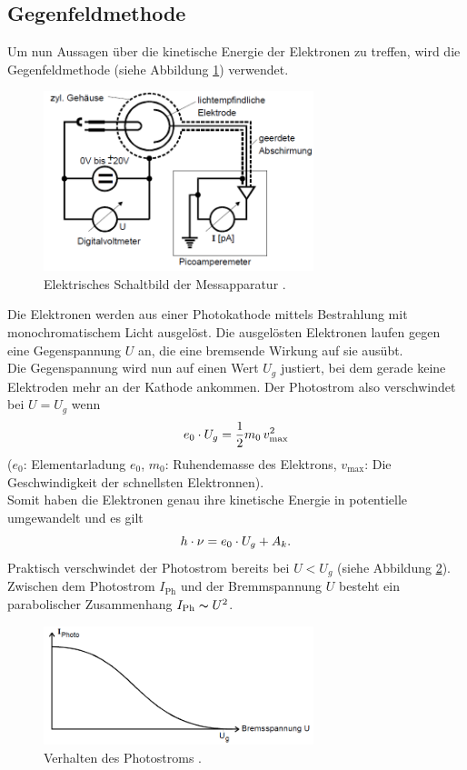 \subsection{Gegenfeldmethode}
Um nun Aussagen über die kinetische Energie der Elektronen zu treffen, wird die  Gegenfeldmethode (siehe Abbildung \ref{fig:Messapparatur}) verwendet.
\begin{figure}[H]
    \centering
    \includegraphics[width=0.7\textwidth]{Messapparatur.png}
    \caption{Elektrisches Schaltbild der Messapparatur \cite{1}.}
    \label{fig:Messapparatur}
\end{figure}
\noindent 
Die Elektronen werden aus einer Photokathode mittels Bestrahlung mit monochromatischem Licht ausgelöst.
Die ausgelösten Elektronen laufen gegen eine Gegenspannung $U$ an, die eine bremsende Wirkung auf sie ausübt.\\
Die  Gegenspannung wird nun auf einen Wert $U_g$ justiert, bei dem gerade keine Elektroden mehr an der Kathode ankommen.
Der Photostrom also verschwindet bei \( U=U_g\) wenn
 \begin{equation}
    e_0  \cdot U_{g}  = \frac{1}{2} m_0\, v_{\text{max}}^2\\
    \end{equation}
($e_0$: Elementarladung $e_0$, $m_0$: Ruhendemasse des Elektrons, $v_{\text{max}}$: Die Geschwindigkeit der schnellsten Elektronnen).\\
Somit haben die Elektronen genau ihre kinetische Energie in potentielle umgewandelt und es gilt
\begin{equation}
h \cdot \nu = e_0  \cdot U_{g}  + A_k.\\
\end{equation}
Praktisch verschwindet der Photostrom bereits bei \(U<U_g\) (siehe Abbildung \ref{fig:Photostrom}).
Zwischen dem Photostrom $I_\text{Ph}$ und der Bremmspannung $U$ besteht ein parabolischer Zusammenhang \(I_\text{Ph} \thicksim U^2 \).
\begin{figure}[H]
    \centering
    \includegraphics[width=0.7\textwidth]{Photostrom.png}
    \caption{Verhalten des Photostroms \cite{1}.}
    \label{fig:Photostrom}
\end{figure}
